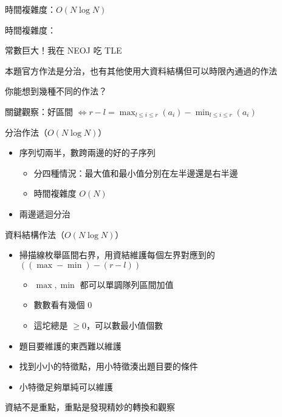 \begin{frame}{}
     {
        時間複雜度：$O(N \log N)$
    }

     {
        時間複雜度：

        常數巨大！我在 NEOJ 吃 TLE
    }
\end{frame}

\begin{frame}{}
    本題官方作法是分治，也有其他使用大資料結構但可以時限內通過的作法

    你能想到幾種不同的作法？
\end{frame}

\begin{frame}{}
    關鍵觀察：好區間 $\iff r - l = \max_{l \leq i \leq r}(a_i) - \min_{l \leq i \leq r}(a_i)$

     {
        分治作法（$O(N \log N)$）
    
        \begin{itemize}
            \item 序列切兩半，數跨兩邊的好的子序列
            \begin{itemize}
                \item 分四種情況：最大值和最小值分別在左半邊還是右半邊
                \item 時間複雜度 $O(N)$
            \end{itemize}
            \item 兩邊遞迴分治
        \end{itemize}
    }
     {
        資料結構作法（$O(N \log N)$）
    
        \begin{itemize}
            \item 掃描線枚舉區間右界，用資結維護每個左界對應到的 $\left(\left(\max - \min\right) - \left(r - l\right)\right)$
            \begin{itemize}
                \item $\max, \min$ 都可以單調隊列區間加值
                \item 數數看有幾個 $0$
                \item 這坨總是 $\geq 0$，可以數最小值個數
            \end{itemize}
        \end{itemize}
    }
\end{frame}

\begin{frame}{\ebtitle}
    \begin{itemize}
        \item 題目要維護的東西難以維護
        \item 找到小小的特徵點，用小特徵湊出題目要的條件
        \item 小特徵足夠單純可以維護
    \end{itemize}

    資結不是重點，重點是發現精妙的轉換和觀察
\end{frame}
